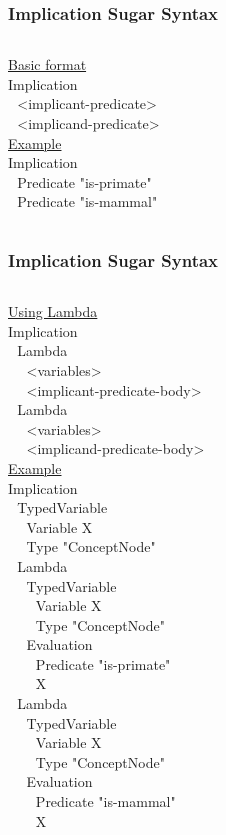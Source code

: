 \documentclass{beamer}
\begin{document}
\frame
{
  \frametitle{Implication Sugar Syntax}

  {\scriptsize

  \begin{columns}
    \column{2in}
    \underline{Basic format}\\[.2cm]
    Implication\\
    $\ \ \ $<implicant-predicate>\\
    $\ \ \ $<implicand-predicate>\\
    \column{1.5in}
    \underline{Example}\\[.2cm]
    Implication\\
    $\ \ \ $Predicate "is-primate"\\
    $\ \ \ $Predicate "is-mammal"\\
  \end{columns}

  }
}

\frame
{
  \frametitle{Implication Sugar Syntax}

  {\tiny

  \begin{columns}
    \column{2in}
    \underline{Using Lambda}\\[.2cm]
    Implication\\
    $\ \ \ $Lambda\\
    $\ \ \ $$\ \ \ $<variables>\\
    $\ \ \ $$\ \ \ $<implicant-predicate-body>\\
    $\ \ \ $Lambda\\
    $\ \ \ $$\ \ \ $<variables>\\
    $\ \ \ $$\ \ \ $<implicand-predicate-body>\\

    \column{2in}
    \underline{Example}\\[.2cm]
    Implication\\
    $\ \ \ $TypedVariable\\
    $\ \ \ $$\ \ \ $Variable X\\
    $\ \ \ $$\ \ \ $Type "ConceptNode"\\
    $\ \ \ $Lambda\\
    $\ \ \ $$\ \ \ $TypedVariable\\
    $\ \ \ $$\ \ \ $$\ \ \ $Variable X\\
    $\ \ \ $$\ \ \ $$\ \ \ $Type "ConceptNode"\\
    $\ \ \ $$\ \ \ $Evaluation\\
    $\ \ \ $$\ \ \ $$\ \ \ $Predicate "is-primate"\\
    $\ \ \ $$\ \ \ $$\ \ \ $X\\
    $\ \ \ $Lambda\\
    $\ \ \ $$\ \ \ $TypedVariable\\
    $\ \ \ $$\ \ \ $$\ \ \ $Variable X\\
    $\ \ \ $$\ \ \ $$\ \ \ $Type "ConceptNode"\\
    $\ \ \ $$\ \ \ $Evaluation\\
    $\ \ \ $$\ \ \ $$\ \ \ $Predicate "is-mammal"\\
    $\ \ \ $$\ \ \ $$\ \ \ $X\\
  \end{columns}

  }
}
  
\end{document}
